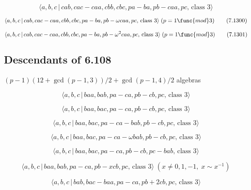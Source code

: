 \documentclass[10pt]{article}
\begin{document}
\begin{equation}
\langle a,b,c\,|\,cab,cac-caa,cbb,cbc,pa-ba,pb-caa,pc,\,\text{class }3\rangle
\tag{7.1299}
\end{equation}

\begin{equation}
\langle a,b,c\,|\,cab,cac-caa,cbb,cbc,pa-ba,pb-\omega caa,pc,\,\text{class }%
3\rangle \;(p=1\func{mod}3)  \tag{7.1300}
\end{equation}

\begin{equation}
\langle a,b,c\,|\,cab,cac-caa,cbb,cbc,pa-ba,pb-\omega ^{2}caa,pc,\,\text{%
class }3\rangle \;(p=1\func{mod}3)  \tag{7.1301}
\end{equation}

\subsection{Descendants of 6.108}

$(p-1)(12+\gcd (p-1,3))/2+\gcd (p-1,4)/2$ algebras

\begin{equation}
\langle a,b,c\,|\,baa,bab,pa-ca,pb-cb,pc,\,\text{class }3\rangle 
\tag{7.1302}
\end{equation}

\begin{equation}
\langle a,b,c\,|\,baa,bac,pa-ca,pb-cb,pc,\,\text{class }3\rangle 
\tag{7.1303}
\end{equation}

\begin{equation}
\langle a,b,c\,|\,baa,bac,pa-ca-bab,pb-cb,pc,\,\text{class }3\rangle 
\tag{7.1304}
\end{equation}

\begin{equation}
\langle a,b,c\,|\,baa,bac,pa-ca-\omega bab,pb-cb,pc,\,\text{class }3\rangle 
\tag{7.1305}
\end{equation}

\begin{equation}
\langle a,b,c\,|\,baa,bac,pa-ca,pb-cb,pc-bab,\,\text{class }3\rangle 
\tag{7.1306}
\end{equation}

\begin{equation}
\langle a,b,c\,|\,baa,bab,pa-ca,pb-xcb,pc,\,\text{class }3\rangle \;(x\neq
0,1,-1,\;x\sim x^{-1})  \tag{7.1307}
\end{equation}

\begin{equation}
\langle a,b,c\,|\,bab,bac-baa,pa-ca,pb+2cb,pc,\,\text{class }3\rangle 
\tag{7.1308}
\end{equation}
\end{document}
